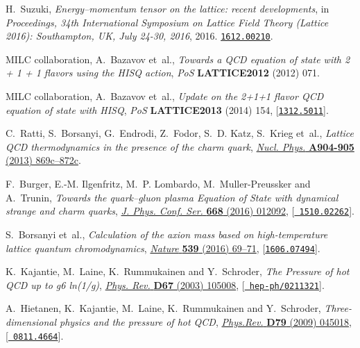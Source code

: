 \documentclass{PoS}
\begin{document}
\begin{thebibliography}{100}
H.~Suzuki, \emph{{Energy--momentum tensor on the lattice: recent
  developments}},  in \emph{{Proceedings, 34th International Symposium on
  Lattice Field Theory (Lattice 2016): Southampton, UK, July 24-30, 2016}},
  2016.
\newblock \href{https://arxiv.org/abs/1612.00210}{{\tt 1612.00210}}.

{\scshape MILC} collaboration, A.~Bazavov et~al., \emph{{Towards a QCD equation
  of state with 2 + 1 + 1 flavors using the HISQ action}}, {\emph{PoS} {\bf
  LATTICE2012} (2012) 071}.

{\scshape MILC} collaboration, A.~Bazavov et~al., \emph{{Update on the 2+1+1
  flavor QCD equation of state with HISQ}}, {\emph{PoS} {\bf LATTICE2013}
  (2014) 154}, [\href{https://arxiv.org/abs/1312.5011}{{\tt 1312.5011}}].

C.~Ratti, S.~Borsanyi, G.~Endrodi, Z.~Fodor, S.~D. Katz, S.~Krieg et~al.,
  \emph{{Lattice QCD thermodynamics in the presence of the charm quark}},
  \href{http://dx.doi.org/10.1016/j.nuclphysa.2013.02.153}{\emph{Nucl. Phys.}
  {\bf A904-905} (2013) 869c--872c}.

F.~Burger, E.-M. Ilgenfritz, M.~P. Lombardo, M.~Muller-Preussker and A.~Trunin,
  \emph{{Towards the quark--gluon plasma Equation of State with dynamical
  strange and charm quarks}},
  \href{http://dx.doi.org/10.1088/1742-6596/668/1/012092}{\emph{J. Phys. Conf.
  Ser.} {\bf 668} (2016) 012092}, [\href{https://arxiv.org/abs/1510.02262}{{\tt
  1510.02262}}].

S.~Borsanyi et~al., \emph{{Calculation of the axion mass based on
  high-temperature lattice quantum chromodynamics}},
  \href{http://dx.doi.org/10.1038/nature20115}{\emph{Nature} {\bf 539} (2016)
  69--71}, [\href{https://arxiv.org/abs/1606.07494}{{\tt 1606.07494}}].

K.~Kajantie, M.~Laine, K.~Rummukainen and Y.~Schroder, \emph{{The Pressure of
  hot QCD up to g6 ln(1/g)}},
  \href{http://dx.doi.org/10.1103/PhysRevD.67.105008}{\emph{Phys. Rev.} {\bf
  D67} (2003) 105008}, [\href{https://arxiv.org/abs/hep-ph/0211321}{{\tt
  hep-ph/0211321}}].

A.~Hietanen, K.~Kajantie, M.~Laine, K.~Rummukainen and Y.~Schroder,
  \emph{{Three-dimensional physics and the pressure of hot QCD}},
  \href{http://dx.doi.org/10.1103/PhysRevD.79.045018}{\emph{Phys.Rev.} {\bf
  D79} (2009) 045018}, [\href{https://arxiv.org/abs/0811.4664}{{\tt
  0811.4664}}].


\end{thebibliography}
\end{document}
